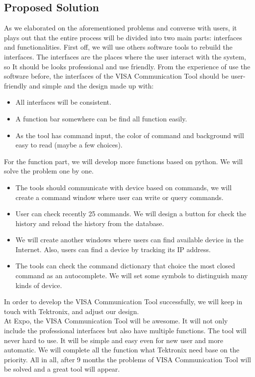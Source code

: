 \documentclass[letterpaper,10pt,notitlepage]{article}
\begin{document}
\subsection{Proposed Solution}
As we elaborated on the aforementioned problems and converse with users, it plays out that the entire process will be divided into two main parts: interfaces and functionalities. First off, we will use others software tools to rebuild the interfaces. The interfaces are the places where the user interact with the system, so It should be looks professional and use friendly. From the experience of use the software before, the interfaces of the VISA Communication Tool should be user-friendly and simple and the design made up with:
    \begin{itemize}
        \item All interfaces will be consistent.
        \item A function bar somewhere can be find all function easily.
        \item As the tool has command input, the color of command and background will easy to read (maybe a few choices).
    \end{itemize}
For the function part, we will develop more functions based on python. We will solve the problem one by one.
    \begin{itemize}
        \item The tools should communicate with device based on commands, we will create a command window where user can write or query commands.
        \item User can check recently 25 commands. We will design a button for check the history and reload the history from the database.
        \item We will create another windows where users can find available device in the Internet. Also, users can find a device by tracking its IP address.
        \item The tools can check the command dictionary that choice the most closed command as an autocomplete. We will set some symbols to distinguish many kinds of device.
    \end{itemize}
In order to develop the VISA Communication Tool successfully, we will keep in touch with Tektronix, and adjust our design. 
\vspace{0.3cm}
\\
At Expo, the VISA Communication Tool will be awesome. It will not only include the professional interfaces but also have multiple functions. The tool will never hard to use. It will be simple and easy even for new user and more automatic. We will complete all the function what Tektronix need base on the priority. All in all, after 9 months the problems of VISA Communication Tool will be solved and a great tool will appear.
\end{document}
